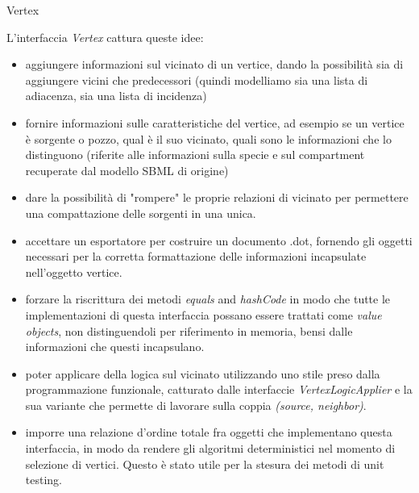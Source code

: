 \begin{paragraph}{Vertex}

L'interfaccia \emph{Vertex} cattura queste idee:
\begin{itemize}
\item aggiungere informazioni sul vicinato di un vertice, dando la
  possibilit\`a sia di aggiungere vicini che predecessori (quindi
  modelliamo sia una lista di adiacenza, sia una lista di incidenza)
\item fornire informazioni sulle caratteristiche del vertice, ad
  esempio se un vertice \`e sorgente o pozzo, qual \`e il suo
  vicinato, quali sono le informazioni che lo distinguono (riferite
  alle informazioni sulla specie e sul compartment recuperate dal
  modello SBML di origine)
\item dare la possibilit\`a di "rompere" le proprie relazioni di
  vicinato per permettere una compattazione delle sorgenti in una
  unica.
\item accettare un esportatore per costruire un documento .dot,
  fornendo gli oggetti necessari per la corretta formattazione delle
  informazioni incapsulate nell'oggetto vertice.
\item forzare la riscrittura dei metodi \emph{equals} and
  \emph{hashCode} in modo che tutte le implementazioni di questa
  interfaccia possano essere trattati come \emph{value objects}, non
  distinguendoli per riferimento in memoria, bensi dalle informazioni
  che questi incapsulano.
\item poter applicare della logica sul vicinato utilizzando uno stile
  preso dalla programmazione funzionale, catturato dalle interfaccie
  \emph{VertexLogicApplier} e la sua variante che permette di lavorare
  sulla coppia \emph{(source, neighbor)}.
\item imporre una relazione d'ordine totale fra oggetti che
  implementano questa interfaccia, in modo da rendere gli algoritmi
  deterministici nel momento di selezione di vertici. Questo \`e stato
  utile per la stesura dei metodi di unit testing.
\end{itemize}
\end{paragraph}


